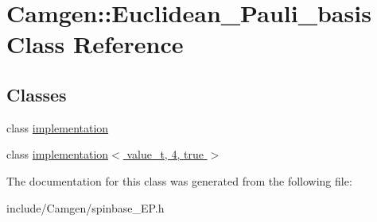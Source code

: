 \hypertarget{a00138}{}\section{Camgen\+:\+:Euclidean\+\_\+\+Pauli\+\_\+basis Class Reference}
\label{a00138}
\subsection*{Classes}
\begin{DoxyCompactItemize}
\item 
class \hyperlink{a00288}{implementation}
\item 
class \hyperlink{a00303}{implementation$<$ value\+\_\+t, 4, true $>$}
\end{DoxyCompactItemize}


The documentation for this class was generated from the following file\+:\begin{DoxyCompactItemize}
\item 
include/\+Camgen/spinbase\+\_\+\+E\+P.\+h\end{DoxyCompactItemize}
